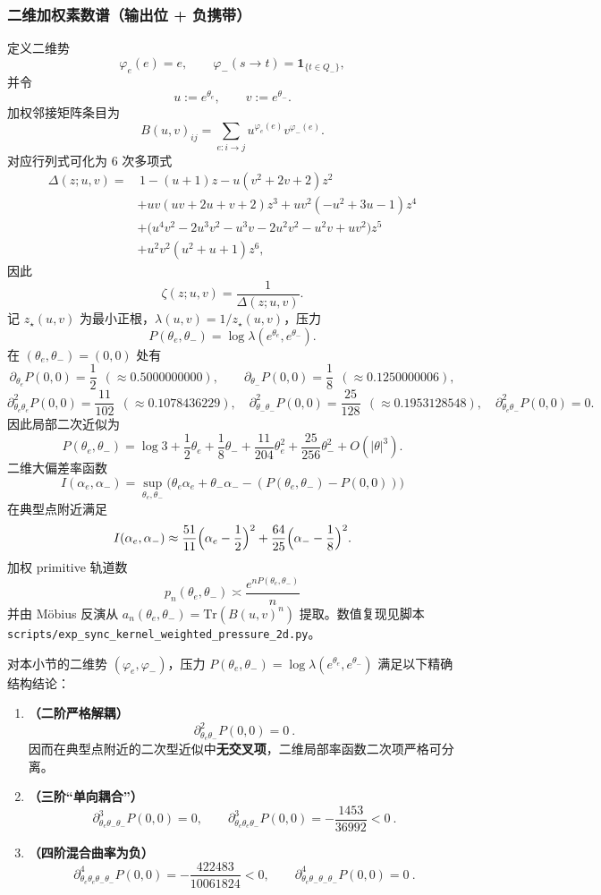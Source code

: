 \subsubsection{二维加权素数谱（输出位 + 负携带）}
定义二维势
\[
\varphi_e(e)=e,\qquad \varphi_-(s\to t)=\mathbf{1}_{\{t\in Q_-\}},
\]
并令
\[
u:=e^{\theta_e},\qquad v:=e^{\theta_-}.
\]
加权邻接矩阵条目为
\[
B(u,v)_{ij}=\sum_{e:i\to j}u^{\varphi_e(e)}v^{\varphi_-(e)}.
\]
对应行列式可化为 6 次多项式
\[
\begin{aligned}
\Delta(z;u,v)=&\,1-(u+1)z-u(v^2+2v+2)z^2\\
&+uv(uv+2u+v+2)z^3+uv^2(-u^2+3u-1)z^4\\
&+\bigl(u^4v^2-2u^3v^2-u^3v-2u^2v^2-u^2v+uv^2\bigr)z^5\\
&+u^2v^2(u^2+u+1)z^6,
\end{aligned}
\]
因此
\[
\zeta(z;u,v)=\frac{1}{\Delta(z;u,v)}.
\]
记 $z_\star(u,v)$ 为最小正根，$\lambda(u,v)=1/z_\star(u,v)$，压力
\[
P(\theta_e,\theta_-)=\log\lambda(e^{\theta_e},e^{\theta_-}).
\]
在 $(\theta_e,\theta_-)=(0,0)$ 处有
\[
\partial_{\theta_e}P(0,0)=\frac12\ \ (\approx 0.5000000000),\qquad
\partial_{\theta_-}P(0,0)=\frac18\ \ (\approx 0.1250000006),
\]
\[
\partial^2_{\theta_e\theta_e}P(0,0)=\frac{11}{102}\ \ (\approx 0.1078436229),\quad
\partial^2_{\theta_-\theta_-}P(0,0)=\frac{25}{128}\ \ (\approx 0.1953128548),\quad
\partial^2_{\theta_e\theta_-}P(0,0)=0.
\]
因此局部二次近似为
\[
P(\theta_e,\theta_-)=\log 3+\frac12\theta_e+\frac18\theta_-+\frac{11}{204}\theta_e^2+\frac{25}{256}\theta_-^2+O(|\theta|^3).
\]
二维大偏差率函数
\[
I(\alpha_e,\alpha_-)=\sup_{\theta_e,\theta_-}\bigl(\theta_e\alpha_e+\theta_-\alpha_- - (P(\theta_e,\theta_-)-P(0,0))\bigr)
\]
在典型点附近满足
\[
I(\alpha_e,\alpha_-)\approx \frac{51}{11}\Bigl(\alpha_e-\frac12\Bigr)^2+\frac{64}{25}\Bigl(\alpha_- -\frac18\Bigr)^2.
\]
加权 primitive 轨道数
\[
p_n(\theta_e,\theta_-)\asymp \frac{e^{nP(\theta_e,\theta_-)}}{n}
\]
并由 Möbius 反演从 $a_n(\theta_e,\theta_-)=\mathrm{Tr}(B(u,v)^n)$ 提取。数值复现见脚本 \texttt{scripts/exp\_sync\_kernel\_weighted\_pressure\_2d.py}。

\begin{proposition}[二维势的二阶严格解耦与首个非高斯混合项]\label{prop:sync-kernel-2d-exact-decouple}
对本小节的二维势 \((\varphi_e,\varphi_-)\)，压力
\(
P(\theta_e,\theta_-)=\log\lambda(e^{\theta_e},e^{\theta_-})
\)
满足以下精确结构结论：
\begin{enumerate}
  \item \textbf{（二阶严格解耦）}
  \[
  \boxed{\ \partial^2_{\theta_e\theta_-}P(0,0)=0\ }.
  \]
  因而在典型点附近的二次型近似中\textbf{无交叉项}，二维局部率函数二次项严格可分离。
  \item \textbf{（三阶“单向耦合”）}
  \[
  \boxed{\ \partial^3_{\theta_e\theta_-\theta_-}P(0,0)=0,\qquad
  \partial^3_{\theta_e\theta_e\theta_-}P(0,0)=-\frac{1453}{36992}<0\ }.
  \]
  \item \textbf{（四阶混合曲率为负）}
  \[
  \boxed{\ \partial^4_{\theta_e\theta_e\theta_-\theta_-}P(0,0)=-\frac{422483}{10061824}<0,\qquad
  \partial^4_{\theta_e\theta_-\theta_-\theta_-}P(0,0)=0\ }.
  \]
\end{enumerate}
\end{proposition}

